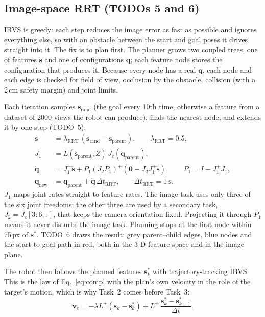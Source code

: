\documentclass[11pt,a4paper]{article}
\newcommand{\vect}[1]{\bm{#1}}
\newcommand{\pinv}{^{+}}
\begin{document}
\subsection{Image-space RRT (TODOs 5 and 6)}

IBVS is greedy: each step reduces the image error as fast as possible and ignores everything else, so
with an obstacle between the start and goal poses it drives straight into it. The fix is to plan
first. The planner grows two coupled trees, one of features $\vect s$ and one of configurations
$\vect q$; each feature node stores the configuration that produces it. Because every node has a real
$\vect q$, each node and each edge is checked for field of view, occlusion by the obstacle, collision
(with a 2\,cm safety margin) and joint limits.

Each iteration samples $\vect s_{\text{rand}}$ (the goal every 10th time, otherwise a feature from a
dataset of 2000 views the robot can produce), finds the nearest node, and extends it by one step
(TODO~5):
\begin{align}
  \dot{\vect s}&=\lambda_{\text{RRT}}\,(\vect s_{\text{rand}}-\vect s_{\text{parent}}),\qquad \lambda_{\text{RRT}}=0.5,\\
  J_1&=L(\vect s_{\text{parent}},Z)\,J_c(\vect q_{\text{parent}}),\\
  \dot{\vect q}&=J_1\pinv\dot{\vect s}+P_1(J_2P_1)\pinv\!\left(\vect 0-J_2J_1\pinv\dot{\vect s}\right),\qquad P_1=I-J_1\pinv J_1,\\
  \vect q_{\text{new}}&=\vect q_{\text{parent}}+\dot{\vect q}\,\Delta t_{\text{RRT}},\qquad \Delta t_{\text{RRT}}=1\ \text{s}.
\end{align}
$J_1$ maps joint rates straight to feature rates. The image task uses only three of the six joint
freedoms; the other three are used by a secondary task, $J_2=J_c[3{:}6,:]$, that keeps the camera
orientation fixed. Projecting it through $P_1$ means it never disturbs the image task. Planning stops
at the first node within 75\,px of $\vect s^{*}$. TODO~6 draws the result: grey parent--child edges,
blue nodes and the start-to-goal path in red, both in the 3-D feature space and in the image plane.

The robot then follows the planned features $\vect s^{*}_k$ with trajectory-tracking IBVS. This is the
law of Eq.~\eqref{eq:comp} with the plan's own velocity in the role of the target's motion, which is why
Task~2 comes before Task~3:
\begin{equation}
  \vect v_c=-\lambda L\pinv(\vect s_k-\vect s^{*}_k)+L\pinv\,\frac{\vect s^{*}_k-\vect s^{*}_{k-1}}{\Delta t}.
\end{equation}
\end{document}
